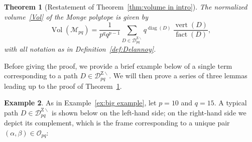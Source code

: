 \documentclass[noamsfonts,10pt]{amsart}
\newcommand{\M}{\mathcal{M}}
\newcommand{\DZ}{\mathcal{D}^{\mathrm{Z} \!\!\!\! \backslash}}
\newcommand{\al}{\alpha}
\newcommand{\be}{\beta}
\renewcommand{\O}{\mathcal{O}}
\newcommand{\dd}{\operatorname{diag}}
\newcommand{\vv}{\operatorname{vert}}
\newcommand{\ff}{\operatorname{fact}}
\DeclareMathOperator{\Vol}{Vol}
\newcommand{\1}{\mathbf{1}}
\theoremstyle{plain}
\newtheorem{theorem}{Theorem}[section]
\theoremstyle{definition}
\newtheorem{example}[theorem]{Example}
\numberwithin{equation}{section}
\begin{document}
\begin{theorem}[Restatement of Theorem~\ref{thm:volume in intro}]
    \label{thm:volume in body}
    The normalized volume~\eqref{Vol} of the Monge polytope is given by
    \[
    \Vol(\M_{pq}) = \frac{1}{p^q q^{p-1}} \sum_{D \in \DZ_{pq}} q^{\dd(D)} \: \frac{\vv(D)}{\ff(D)},
    \]
    with all notation as in Definition~\ref{def:Delannoy}.
\end{theorem}

Before giving the proof, we provide a brief example below of a single term corresponding to a path $D \in \DZ_{pq}$.
We will then prove a series of three lemmas leading up to the proof of Theorem~\ref{thm:volume in body}.

\begin{example}
    \label{ex:Delannoy}
    As in Example~\ref{ex:big example}, let $p=10$ and $q=15$.
    A typical path $D \in \DZ_{pq}$ is shown below on the left-hand side;
    on the right-hand side we depict its complement, which is the frame corresponding to a unique pair $(\al,\be) \in \O_{pq}$:
    

    


\end{example}
\end{document}
